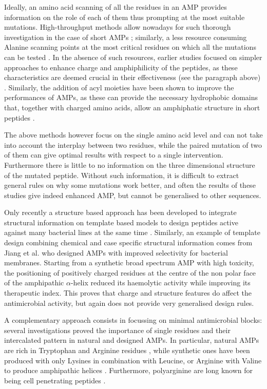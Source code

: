 Ideally, an amino acid scanning of all the residues in an AMP provides information on the role of each of them thus prompting at the most suitable mutations. High-throughput methods allow nowadays for such thorough investigation in the case of short AMPs \cite{Hilpert2005,Hilpert2006}; similarly, a less resource consuming Alanine scanning points at the most critical residues on which all the mutations can be tested \cite{Migon2018,Grieco2011,Xie2018}.
%
In the absence of such resources, earlier studies focused on simpler approaches to enhance charge and amphiphilicity of the peptides, as these characteristics are deemed crucial in their effectiveness (see the paragraph above) \cite{Wiradharma2011,Huang2010,Pag2008,Wang2015}.
%
Similarly, the addition of acyl moieties have been shown to improve the performances of AMPs, as these can provide the necessary hydrophobic domains that, together with charged amino acids, allow an amphiphatic structure in short pep­tides \cite{Radzishevsky2005,Serrano2009,Avrahami2004}.

The above methods however focus on the single amino acid level and can not take into account the interplay between two residues, while the paired mutation of two of them can give optimal results with respect to a single intervention.
%
Furthermore there is little to no information on the three dimensional structure of the mutated peptide. Without such information, it is difficult to extract general rules on why some mutations work better, and often the results of these studies give indeed enhanced AMP, but cannot be generalised to other sequences.

Only recently a structure based approach has been developed to integrate structural information on template based models to design peptides active against many bacterial lines at the same time \cite{Liu2018}.
%
Similarly, an example of template design combining chemical and case specific structural information comes from Jiang et al. \cite{Jiang2011} who designed AMPs with improved selectivity for bacterial membranes. Starting from a synthetic broad spectrum AMP with high toxicity, the positioning of positively charged residues at the centre of the non ­polar face of the amphipathic $\alpha$-helix reduced its haemolytic activity while improving its therapeutic index. This proves that charge and structure features do affect the antimicrobial activity, but again does not provide very generalised design rules.

A complementary approach consists in focussing on minimal antimicrobial blocks: several investigations proved the importance of single residues and their intercalated pattern in natural and designed AMPs. In particular, natural AMPs are rich in Tryptophan and Arginine residues \cite{Chan2006}, while synthetic ones have been produced with only Lysines in combination with Leucine, or Arginine with Valine to produce amphi­pathic helices \cite{Deslouches2005}. Furthermore, polyarginine are long known for being cell penetrating peptides \cite{Schmidt2010}.

